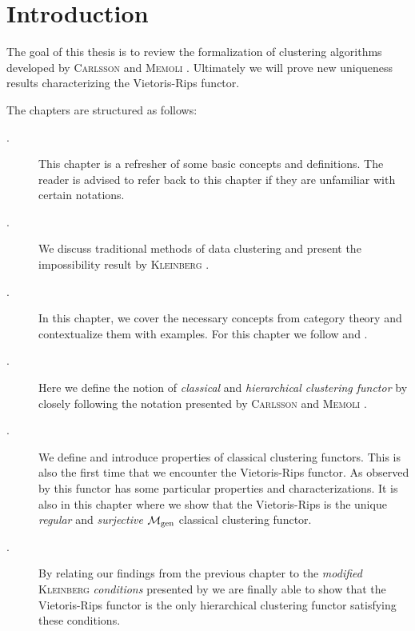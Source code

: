 \chapter*{Introduction}

The goal of this thesis is to review the formalization of clustering algorithms developed by \textsc{Carlsson} and \textsc{Memoli} \cite{Carlsson2010}. Ultimately we will prove new uniqueness results characterizing the Vietoris-Rips functor.

The chapters are structured as follows:
\begin{description}
    \item[.] This chapter is a refresher of some basic concepts and definitions. The reader is advised to refer back to this chapter if they are unfamiliar with certain notations.

    \item[.] We discuss traditional methods of data clustering and present the impossibility result by \textsc{Kleinberg} \cite{Kleinberg2002}.

    \item[.] In this chapter, we cover the necessary concepts from category theory and contextualize them with examples. For this chapter we follow \cite{Roman2017} and \cite{Leinster2014-dc}.

    \item[.] Here we define the notion of \emph{classical} and \emph{hierarchical clustering functor} by closely following the notation presented by \textsc{Carlsson} and \textsc{Memoli} \cite{Carlsson2010}.

    \item[.] We define and introduce properties of classical clustering functors. This is also the first time that we encounter the Vietoris-Rips functor. As observed by \cite{Carlsson2010} this functor has some particular properties and characterizations. It is also in this chapter where we show that the Vietoris-Rips is the unique \emph{regular} and \emph{surjective} ${\mathcal{M}_\mathrm{gen}}$ classical clustering functor.

    \item[.] By relating our findings from the previous chapter to the \emph{modified} \textsc{Kleinberg} \emph{conditions} presented by \cite[Sec.~7.3.1]{Carlsson2010} we are finally able to show that the Vietoris-Rips functor is the only hierarchical clustering functor satisfying these conditions.
\end{description}